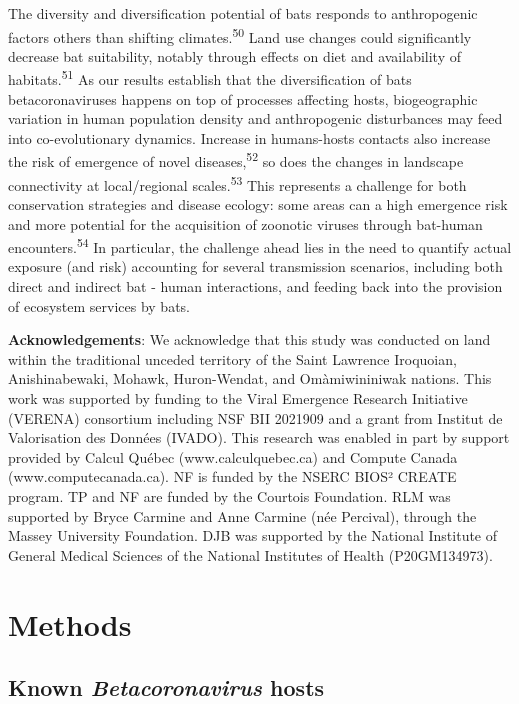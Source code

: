 \documentclass[11pt]{article}
\begin{document}
The diversity and diversification potential of bats responds to
anthropogenic factors others than shifting climates.\textsuperscript{50}
Land use changes could significantly decrease bat suitability, notably
through effects on diet and availability of
habitats.\textsuperscript{51} As our results establish that the
diversification of bats betacoronaviruses happens on top of processes
affecting hosts, biogeographic variation in human population density and
anthropogenic disturbances may feed into co-evolutionary dynamics.
Increase in humans-hosts contacts also increase the risk of emergence of
novel diseases,\textsuperscript{52} so does the changes in landscape
connectivity at local/regional scales.\textsuperscript{53} This
represents a challenge for both conservation strategies and disease
ecology: some areas can a high emergence risk and more potential for the
acquisition of zoonotic viruses through bat-human
encounters.\textsuperscript{54} In particular, the challenge ahead lies
in the need to quantify actual exposure (and risk) accounting for
several transmission scenarios, including both direct and indirect bat -
human interactions, and feeding back into the provision of ecosystem
services by bats.

\textbf{Acknowledgements}: We acknowledge that this study was conducted
on land within the traditional unceded territory of the Saint Lawrence
Iroquoian, Anishinabewaki, Mohawk, Huron-Wendat, and Omàmiwininiwak
nations. This work was supported by funding to the Viral Emergence
Research Initiative (VERENA) consortium including NSF BII 2021909 and a
grant from Institut de Valorisation des Données (IVADO). This research
was enabled in part by support provided by Calcul Québec
(www.calculquebec.ca) and Compute Canada (www.computecanada.ca). NF is
funded by the NSERC BIOS² CREATE program. TP and NF are funded by the
Courtois Foundation. RLM was supported by Bryce Carmine and Anne Carmine
(née Percival), through the Massey University Foundation. DJB was
supported by the National Institute of General Medical Sciences of the
National Institutes of Health (P20GM134973).

\newpage

\hypertarget{methods}{%
\section{Methods}\label{methods}}

\hypertarget{known-betacoronavirus-hosts}{%
\subsection{\texorpdfstring{Known \emph{Betacoronavirus}
hosts}{Known Betacoronavirus hosts}}\label{known-betacoronavirus-hosts}}
\end{document}
